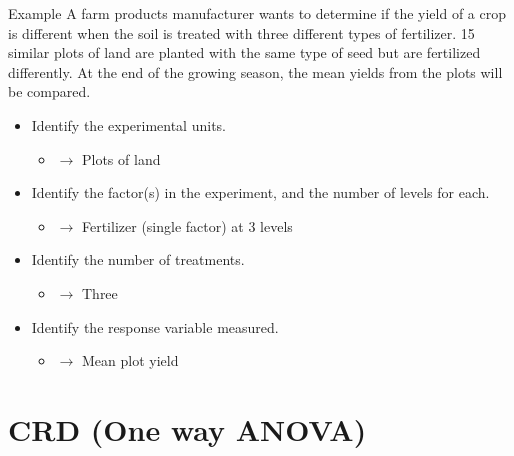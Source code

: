 \documentclass[
  ignorenonframetext,
  aspectratio=169]{beamer}
\providecommand{\tightlist}{%
  \setlength{\itemsep}{0pt}\setlength{\parskip}{0pt}}
\begin{document}
\begin{frame}{Example}
\protect\hypertarget{example}{}
A farm products manufacturer wants to determine if the yield of a crop
is different when the soil is treated with three different types of
fertilizer. 15 similar plots of land are planted with the same type of
seed but are fertilized differently. At the end of the growing season,
the mean yields from the plots will be compared.

\begin{itemize}[<+->]
\tightlist
\item
  Identify the experimental units.

  \begin{itemize}[<+->]
  \tightlist
  \item
    \(\longrightarrow\) Plots of land
  \end{itemize}
\item
  Identify the factor(s) in the experiment, and the number of levels for
  each.

  \begin{itemize}[<+->]
  \tightlist
  \item
    \(\longrightarrow\) Fertilizer (single factor) at 3 levels
  \end{itemize}
\item
  Identify the number of treatments.

  \begin{itemize}[<+->]
  \tightlist
  \item
    \(\longrightarrow\) Three
  \end{itemize}
\item
  Identify the response variable measured.

  \begin{itemize}[<+->]
  \tightlist
  \item
    \(\longrightarrow\) Mean plot yield
  \end{itemize}
\end{itemize}
\end{frame}

\hypertarget{crd-one-way-anova}{%
\section{CRD (One way ANOVA)}\label{crd-one-way-anova}}
\end{document}
